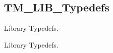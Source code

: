 \hypertarget{group___t_m___l_i_b___typedefs}{}\subsection{T\+M\+\_\+\+L\+I\+B\+\_\+\+Typedefs}
\label{group___t_m___l_i_b___typedefs}


Library Typedefs.  


Library Typedefs. 

